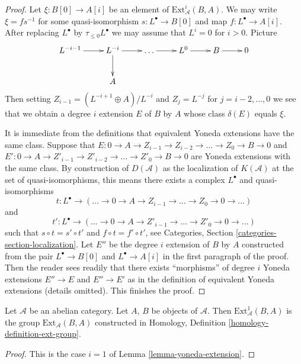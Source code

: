 \begin{proof}
Let $\xi : B[0] \to A[i]$ be an element of $\text{Ext}^i_\mathcal{A}(B, A)$.
We may write $\xi = f s^{-1}$ for some quasi-isomorphism
$s : L^\bullet \to B[0]$ and map $f : L^\bullet \to A[i]$.
After replacing $L^\bullet$ by $\tau_{\leq 0}L^\bullet$ we may assume
that $L^i = 0$ for $i > 0$. Picture
$$
\xymatrix{
L^{- i - 1} \ar[r] & L^{-i} \ar[r] \ar[d] & \ldots \ar[r] &
L^0 \ar[r] & B \ar[r] & 0 \\
& A
}
$$
Then setting $Z_{i - 1} = (L^{- i + 1} \oplus A)/L^{-i}$ and
$Z_j = L^{-j}$ for $j = i - 2, \ldots, 0$ we see that we obtain a
degree $i$ extension $E$ of $B$ by $A$ whose class $\delta(E)$ equals
$\xi$.

\medskip\noindent
It is immediate from the definitions that equivalent Yoneda extensions
have the same class. Suppose that
$E : 0 \to A \to Z_{i - 1} \to Z_{i - 2} \to \ldots \to Z_0 \to B \to 0$ and
$E' : 0 \to A \to Z'_{i - 1} \to Z'_{i - 2} \to \ldots \to Z'_0 \to B \to 0$
are Yoneda extensions with the same class.
By construction of $D(\mathcal{A})$ as the localization
of $K(\mathcal{A})$ at the set of quasi-isomorphisms, this means there
exists a complex $L^\bullet$ and quasi-isomorphisms
$$
t : L^\bullet \to
(\ldots \to 0 \to A \to Z_{i - 1} \to \ldots \to Z_0 \to 0 \to \ldots)
$$
and
$$
t' : L^\bullet \to
(\ldots \to 0 \to A \to Z'_{i - 1} \to \ldots \to Z'_0 \to 0 \to \ldots)
$$
such that $s \circ t = s' \circ t'$ and $f \circ t = f' \circ t'$, see
Categories, Section \ref{categories-section-localization}.
Let $E''$ be the degree $i$ extension of $B$ by $A$ constructed from
the pair $L^\bullet \to B[0]$ and $L^\bullet \to A[i]$ in the first
paragraph of the proof. Then the reader sees readily that there exists
``morphisms'' of degree $i$ Yoneda extensions $E'' \to E$ and $E'' \to E'$
as in the definition of equivalent Yoneda extensions (details omitted).
This finishes the proof.
\end{proof}

\begin{lemma}
\label{lemma-ext-1}
Let $\mathcal{A}$ be an abelian category. Let $A$, $B$ be objects
of $\mathcal{A}$. Then $\text{Ext}^1_\mathcal{A}(B, A)$ is
the group $\text{Ext}_\mathcal{A}(B, A)$ constructed in
Homology, Definition \ref{homology-definition-ext-group}.
\end{lemma}

\begin{proof}
This is the case $i = 1$ of
Lemma \ref{lemma-yoneda-extension}.
\end{proof}




